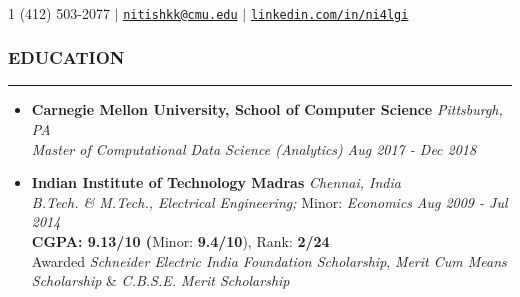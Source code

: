 \documentclass[10pt,a4paper,English]{article}
\newcommand\roottitle[1]{\vspace{-4mm}\subsubsection*{\uppercase{#1}}\vspace{-0.3em}\nopagebreak[4]\hrule\vspace{4mm}}
\newcommand\itemyear[1]{\hfill \emph{\color{itemyear} #1}}
\newcommand\itemenvnoindent{\setlength\itemsep{-1pt} \vspace{-1.5mm}}
\newcommand\hspacing{1mm}
\begin{document}
 \\
\vspace{-5mm}

\small

\begin{center}
    \textsmaller{+}1 (412) 503-2077 $\vert$ \href{mailto:nitishkk@cmu.edu}{\texttt{nitishkk\mbox{}@\mbox{}cmu.edu}} $\vert$ \href{https://www.linkedin.com/in/ni4lgi}{\texttt{linkedin.com/in/ni4lgi}} \\
\end{center}



\roottitle{Education}
    \begin{itemize}[leftmargin=11pt] \itemenvnoindent
    
    \item \textbf{Carnegie Mellon University, School of Computer Science} \itemyear{Pittsburgh, PA}\\[\hspacing]
        \textit{Master of Computational Data Science (Analytics)} \itemyear{Aug 2017 - Dec 2018} \\[\hspacing]

    \vspace{-3mm}

    \item \textbf{Indian Institute of Technology Madras}  \itemyear{Chennai, India}\\[\hspacing]
        \textit{B.Tech. \& M.Tech., Electrical Engineering;} Minor: \textit{Economics} \itemyear{Aug 2009 - Jul 2014}\\[\hspacing]
        \textbf{CGPA: 9.13/10 (}Minor: \textbf{9.4/10}), Rank: \textbf{2/24} \\[\hspacing]
        Awarded \textit{Schneider Electric India Foundation Scholarship},
        \textit{Merit Cum Means Scholarship} \& \textit{C.B.S.E. Merit Scholarship}
    \end{itemize}
\end{document}
